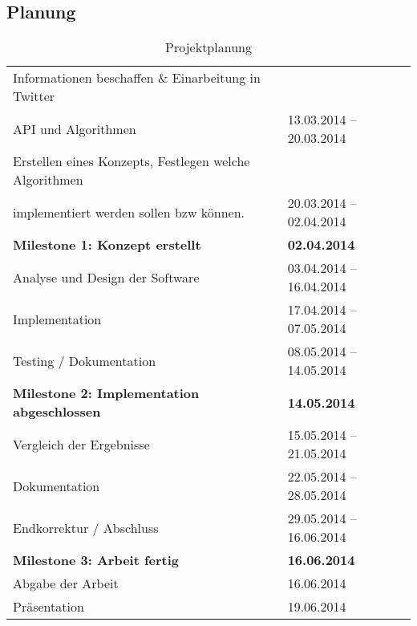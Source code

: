 \subsection{Planung}
\begin{table}[H]
\begin{center}
\begin{tabular}{|l|l|}
	\hline
	Informationen beschaffen \& Einarbeitung in Twitter & \\
	API und Algorithmen & 13.03.2014 – 20.03.2014\\ \hline
	Erstellen eines Konzepts, Festlegen welche Algorithmen & \\
	implementiert werden sollen bzw können. & 20.03.2014 – 02.04.2014\\ \hline
	\textbf{Milestone 1: Konzept erstellt} & \textbf{02.04.2014}\\ \hline
	Analyse und Design der Software & 03.04.2014 – 16.04.2014\\ \hline
	Implementation & 17.04.2014 – 07.05.2014\\ \hline
	Testing / Dokumentation & 08.05.2014 – 14.05.2014\\ \hline
	\textbf{Milestone 2: Implementation abgeschlossen} & \textbf{14.05.2014} \\ \hline
	Vergleich der Ergebnisse & 15.05.2014 – 21.05.2014\\ \hline
	Dokumentation & 22.05.2014 – 28.05.2014\\ \hline
	Endkorrektur / Abschluss & 29.05.2014 – 16.06.2014\\ \hline
	\textbf{Milestone 3: Arbeit fertig} & \textbf{16.06.2014} \\ \hline
	Abgabe der Arbeit & 16.06.2014 \\ \hline
	Präsentation & 19.06.2014 \\ \hline
\end{tabular}
\caption{Projektplanung}
\end{center}
\end{table}
